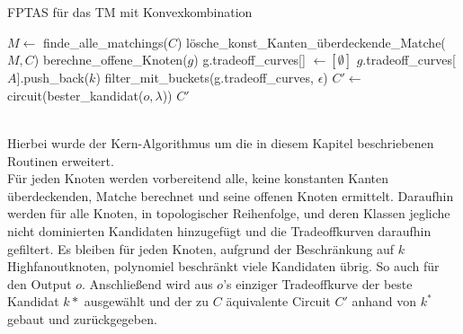\documentclass[11pt, a4paper, german]{article}
\begin{document}
\LinesNumbered
\begin{algorithm}[H]
\DontPrintSemicolon
\caption{FPTAS f\"ur das TM mit Konvexkombination}

   $M \gets$ finde\_alle\_matchings($C$)\;
   lösche\_konst\_Kanten\_überdeckende\_Matche($M, C$)\;
        {
			berechne\_offene\_Knoten($g$)\;	 
        }
  {
    g.tradeoff\_curves[] $\gets [\emptyset]$\;
    {
      {
        {
        	 {
			$g$.tradeoff\_curves[$A$].push\_back($k$)\;      	 
        	 }  
        }
      }
    }
    filter\_mit\_buckets(g.tradeoff\_curves, $\epsilon$)\;
  }
  $C' \gets $ circuit(bester\_kandidat($o, \lambda$))\;
  \Return $C'$\;
\end{algorithm}\ \\

Hierbei wurde der Kern-Algorithmus um die in diesem Kapitel beschriebenen Routinen erweitert. \\
Für jeden Knoten werden vorbereitend alle, keine konstanten Kanten überdeckenden, Matche berechnet und seine offenen Knoten ermittelt. Daraufhin werden für alle Knoten, in topologischer Reihenfolge, und deren Klassen  jegliche nicht dominierten Kandidaten hinzugefügt und die Tradeoffkurven daraufhin gefiltert. Es bleiben für jeden Knoten, aufgrund der Beschränkung auf $k$ Highfanoutknoten, polynomiel beschränkt viele Kandidaten übrig. So auch für den Output $o$. Anschließend wird aus $o$'s einziger Tradeoffkurve der beste Kandidat $k*$ ausgewählt und der zu $C$ äquivalente Circuit $C'$ anhand von $k^*$ gebaut und zurückgegeben.
\end{document}
